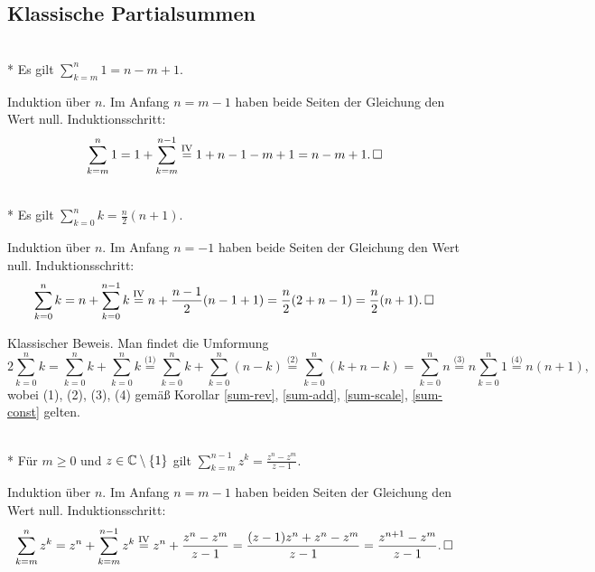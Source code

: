 \newpage
\subsection{Klassische Partialsummen}

\begin{Korollar}%
\label{sum-const}\mbox{}\\*
Es gilt $\displaystyle\sum_{k=m}^n 1 = n-m+1$.
\end{Korollar}
\begin{Beweis}
Induktion über $n$. Im Anfang $n=m-1$ haben beide Seiten
der Gleichung den Wert null. Induktionsschritt:
\[\sum_{k=m}^n 1 = 1 + \sum_{k=m}^{n-1}
\stackrel{\mathrm{IV}}= 1 + n-1-m+1 = n-m+1.\,\square\]
\end{Beweis}

\begin{Satz}\mbox{}\\*
Es gilt $\displaystyle\sum_{k=0}^n k = \frac{n}{2}(n+1)$.
\end{Satz}
\begin{Beweis}[Beweis 1]
Induktion über $n$. Im Anfang $n=-1$ haben beide Seiten der Gleichung
den Wert null. Induktionsschritt:
\[\sum_{k=0}^n k = n + \sum_{k=0}^{n-1} k
\stackrel{\mathrm{IV}}= n + \frac{n-1}{2}(n-1+1)
= \frac{n}{2}(2 + n-1) = \frac{n}{2}(n+1).\,\square\]
\end{Beweis}
\begin{Beweis}[Beweis 2]
Klassischer Beweis. Man findet die Umformung
\[2\!\sum_{k=0}^n k = \!\sum_{k=0}^n k + \!\sum_{k=0}^n k
\stackrel{\text{(1)}}= \!\sum_{k=0}^n k + \!\sum_{k=0}^n (n-k)
\stackrel{\text{(2)}}= \!\sum_{k=0}^n (k+n-k)
= \!\sum_{k=0}^n n \stackrel{\text{(3)}}= n\!\sum_{k=0}^n 1
\stackrel{\text{(4)}}= n(n+1),\]
wobei (1), (2), (3), (4) gemäß Korollar
\ref{sum-rev}, \ref{sum-add}, \ref{sum-scale}, \ref{sum-const}
gelten.\,\qedsymbol
\end{Beweis}

\begin{Satz}%
\label{sum-geom-seq}\mbox{}\\*
Für $m\ge 0$ und $z\in\mathbb C\setminus\{1\}$ gilt
$\displaystyle\sum_{k=m}^{n-1} z^k = \frac{z^n-z^m}{z-1}$.
\end{Satz}
\begin{Beweis}
Induktion über $n$. Im Anfang $n=m-1$ haben beiden Seiten der Gleichung
den Wert null. Induktionsschritt:
\[\sum_{k=m}^n z^k = z^n + \sum_{k=m}^{n-1} z^k
\stackrel{\mathrm{IV}}= z^n + \frac{z^n-z^m}{z-1}
= \frac{(z-1)z^n+z^n-z^m}{z-1}
= \frac{z^{n+1}-z^m}{z-1}.\,\square\]
\end{Beweis}

